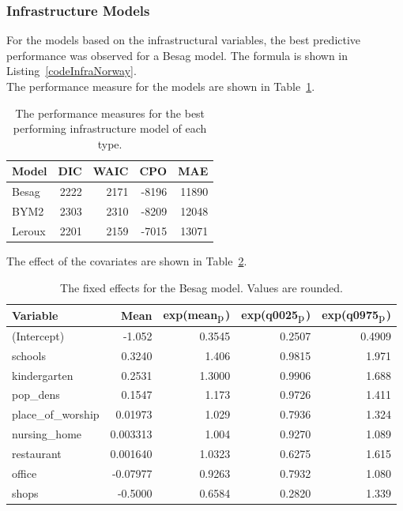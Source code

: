 \subsubsection{Infrastructure Models}
For the models based on the infrastructural variables, the best predictive performance was observed for a Besag model. The formula is shown in Listing~\ref{codeInfraNorway}. \\
The performance measure for the models are shown in Table~\ref{infraNorway}.
\begin{table}[H] 
\caption{The performance measures for the best performing infrastructure model of each type. \label{infraNorway}}
\begin{tabular}{l r r r r}
\toprule
\textbf{Model}	& \textbf{DIC}	& \textbf{WAIC} & \textbf{CPO} & \textbf{MAE} \\
\midrule
Besag  & 2222 & 2171 & -8196 & 11890 \\
BYM2 & 2303 & 2310 & -8209 & 12048\\
Leroux &  2201 & 2159 & -7015 & 13071\\
\bottomrule
\end{tabular}
\end{table}
The effect of the covariates are shown in Table~\ref{fixedInfraNorway}.
\begin{table}[H] 
\caption{The fixed effects for the Besag model. Values are rounded. \label{fixedInfraNorway}}
\begin{tabular}{l r r r r}
\toprule
\textbf{Variable}	& \textbf{Mean}	& \textbf{exp(mean$_{\hbox{p}}$)} & \textbf{exp(q0025$_{\hbox{p}}$)} & \textbf{exp(q0975$_{\hbox{p}}$)} \\
\midrule
(Intercept) & -1.052 & 0.3545 & 0.2507 & 0.4909 \\
schools & 0.3240 & 1.406 & 0.9815 & 1.971 \\
kindergarten & 0.2531 & 1.3000 & 0.9906 & 1.688 \\
pop\_dens & 0.1547 & 1.173 &  0.9726  & 1.411\\
place\_of\_worship & 0.01973 & 1.029 & 0.7936 & 1.324 \\
nursing\_home & 0.003313 & 1.004 & 0.9270 & 1.089\\
restaurant & 0.001640 & 1.0323 & 0.6275 & 1.615 \\
office & -0.07977 & 0.9263 &  0.7932 & 1.080 \\
shops & -0.5000 &0.6584 & 0.2820 & 1.339 \\
\bottomrule
\end{tabular}
\end{table}
